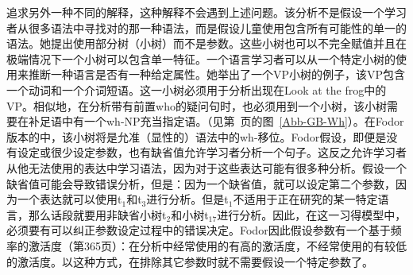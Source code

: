  \citet[]{Fodor98a}追求另外一种不同的解释，这种解释不会遇到上述问题。该分析不是假设一个学习者从很多语法中寻找对的那一种语法，而是假设儿童使用包含所有可能性的单一的语法。她提出使用部分树（小树）而不是参数。这些小树也可以不完全赋值并且在极端情况下一个小树可以包含单一特征\citep[]{Fodor98b}。一个语言学习者可以从一个特定小树的使用来推断一种语言是否有一种给定属性。她举出了一个VP小树的例子，该VP包含一个动词和一个介词短语。这一小树必须用于分析出现在Look at the frog中的VP。相似地，在分析带有前置who的疑问句时，也必须用到一个小树，该小树需要在补足语中有一个wh-NP充当指定语。（见第~\pageref{Abb-GB-Wh}页的图~\ref{Abb-GB-Wh}）。在Fodor版本的\pptc 中，该小树将是允准（显性的）语法中的wh-移位。Fodor假设，即便是没有设定或很少设定参数，也有缺省值允许学习者分析一个句子。这反之允许学习者从他无法使用的表达中学习语法，因为对于这些表达可能有很多种分析。假设一个缺省值可能会导致错误分析，但是：因为一个缺省值，就可以设定第二个参数，因为一个表达就可以使用t$_1$和t$_3$进行分析。但是t$_1$不适用于正在研究的某一特定语言，那么话段就要用非缺省小树t$_2$和小树t$_{17}$进行分析。因此，在这一习得模型中，必须要有可以纠正参数设定过程中的错误决定。Fodor因此假设参数有一个基于频率的激活度（第365页）：在分析中经常使用的有高的激活度，不经常使用的有较低的激活度。以这种方式，在排除其它参数时就不需要假设一个特定参数了。
